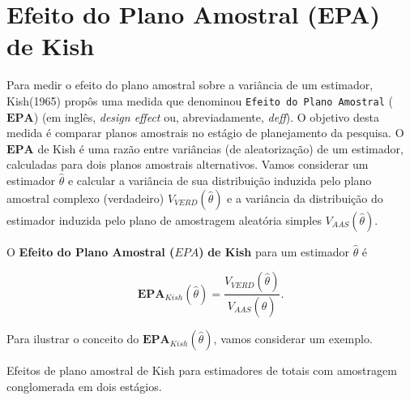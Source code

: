\documentclass[]{book}
\numberwithin{example}{chapter}
\numberwithin{remark}{chapter}
\numberwithin{definition}{chapter}
\let\BeginKnitrBlock\begin \let\EndKnitrBlock\end
\begin{document}
\section{Efeito do Plano Amostral (EPA) de
Kish}\label{efeito-do-plano-amostral-epa-de-kish}

Para medir o efeito do plano amostral sobre a variância de um estimador,
Kish(1965) propôs uma medida que denominou
\texttt{Efeito\ do\ Plano\ Amostral} (\(\mathbf{EPA}\)) (em inglês,
\emph{design effect} ou, abreviadamente, \emph{deff}). O objetivo desta
medida é comparar planos amostrais no estágio de planejamento da
pesquisa. O \(\mathbf{EPA}\) de Kish é uma razão entre variâncias (de
aleatorização) de um estimador, calculadas para dois planos amostrais
alternativos. Vamos considerar um estimador \(\hat{\theta}\) e calcular
a variância de sua distribuição induzida pelo plano amostral complexo
(verdadeiro) \(V_{VERD}\left( \hat{\theta}\right)\) e a variância da
distribuição do estimador induzida pelo plano de amostragem aleatória
simples \(V_{AAS}\left(\hat{\theta}\right)\).

\BeginKnitrBlock{definition}
\protect\hypertarget{def:unnamed-chunk-72}{}{\label{def:unnamed-chunk-72}}O
\textbf{Efeito do Plano Amostral (\(EPA\))} \textbf{de Kish} para um
estimador \(\hat{\theta}\) é
\EndKnitrBlock{definition}

\begin{equation}
\mathbf{EPA}_{Kish}\left( \hat{\theta}\right) =\frac{V_{VERD}\left( \hat{\theta}\right) }{V_{AAS}\left( \hat{\theta}\right) }. \label{eq:epa1} \end{equation}

Para ilustrar o conceito do
\(\mathbf{EPA}_{Kish}\left( \hat{\theta}\right)\), vamos considerar um
exemplo.

\BeginKnitrBlock{example}
\protect\hypertarget{ex:epakish}{}{\label{ex:epakish}}Efeitos de plano
amostral de Kish para estimadores de totais com amostragem conglomerada
em dois estágios.
\EndKnitrBlock{example}
\end{document}
